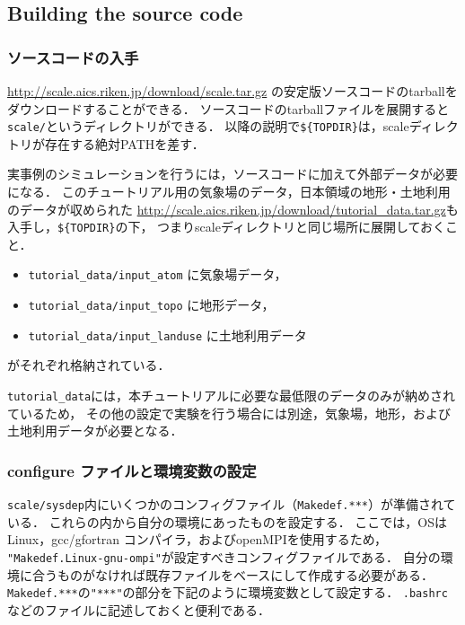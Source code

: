 \subsection{Building the source code} \label{sec:source_code}

\subsubsection{ソースコードの入手}

\url{http://scale.aics.riken.jp/download/scale.tar.gz} の安定版ソースコードのtarballをダウンロードすることができる．
ソースコードのtarballファイルを展開すると\verb|scale/|というディレクトリができる．
以降の説明で\verb|${TOPDIR}|は，scaleディレクトリが存在する絶対PATHを差す．

実事例のシミュレーションを行うには，ソースコードに加えて外部データが必要になる．
このチュートリアル用の気象場のデータ，日本領域の地形・土地利用のデータが収められた
\url{http://scale.aics.riken.jp/download/tutorial_data.tar.gz}も入手し，\verb|${TOPDIR}|の下，
つまりscaleディレクトリと同じ場所に展開しておくこと．\\
\begin{itemize}
 \item \verb|tutorial_data/input_atom| に気象場データ，\\
 \item \verb|tutorial_data/input_topo| に地形データ，\\
 \item \verb|tutorial_data/input_landuse| に土地利用データ\\
\end{itemize}
がそれぞれ格納されている．

\verb|tutorial_data|には，本チュートリアルに必要な最低限のデータのみが納めされているため，
その他の設定で実験を行う場合には別途，気象場，地形，および土地利用データが必要となる．


\subsubsection{configure ファイルと環境変数の設定}

\verb|scale/sysdep|内にいくつかのコンフィグファイル（\verb|Makedef.***|）が準備されている．
これらの内から自分の環境にあったものを設定する．
ここでは，OSはLinux，gcc/gfortran コンパイラ，およびopenMPIを使用するため，
\verb|"Makedef.Linux-gnu-ompi"|が設定すべきコンフィグファイルである．
自分の環境に合うものがなければ既存ファイルをベースにして作成する必要がある．
\verb|Makedef.***|の\verb|"***"|の部分を下記のように環境変数として設定する．
\verb|.bashrc|などのファイルに記述しておくと便利である．

